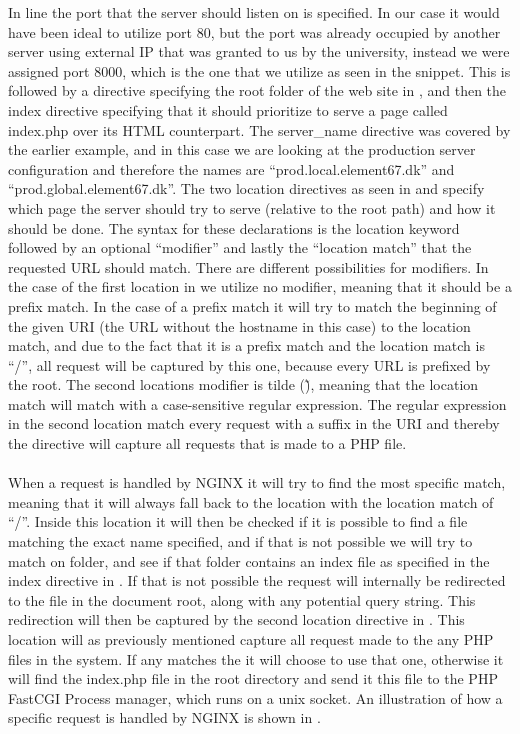 In line  the port that the server should listen on is specified. In our case it would have been ideal to utilize port 80, but the port was already occupied by another server using external IP that was granted to us by the university, instead we were assigned port 8000, which is the one that we utilize as seen in the snippet. This is followed by a directive specifying the root folder of the web site in , and then the index directive specifying that it should prioritize to serve a page called index.php over its HTML counterpart. The server\_name directive was covered by the earlier example, and in this case we are looking at the production server configuration and therefore the names are ``prod.local.element67.dk'' and ``prod.global.element67.dk''. The two location directives as seen in  and  specify which page the server should try to serve (relative to the root path) and how it should be done. The syntax for these declarations is the location keyword followed by an optional ``modifier'' and lastly the ``location match'' that the requested URL should match. There are different possibilities for modifiers. In the case of the first location in  we utilize no modifier, meaning that it should be a prefix match. In the case of a prefix match it will try to match the beginning of the given URI (the URL without the hostname in this case) to the location match, and due to the fact that it is a prefix match and the location match is ``/'', all request will be captured by this one, because every URL is prefixed by the root. The second locations modifier is tilde (\~ ), meaning that the location match will match with a case-sensitive regular expression. The regular expression in the second location match every request with a  suffix in the URI and thereby the directive will capture all requests that is made to a PHP file.
\\\\
When a request is handled by NGINX it will try to find the most specific match, meaning that it will always fall back to the location with the location match of ``/''. Inside this location it will then be checked if it is possible to find a file matching the exact name specified, and if that is not possible we will try to match on folder, and see if that folder contains an index file as specified in the index directive in . If that is not possible the request will internally be redirected to the  file in the document root, along with any potential query string. This redirection will then be captured by the second location directive in . This location will as previously mentioned capture all request made to the any PHP files in the system. If any matches the it will choose to use that one, otherwise it will find the index.php file in the root directory and send it this file to the PHP FastCGI Process manager, which runs on a unix socket. An illustration of how a specific request is handled by NGINX is shown in .

